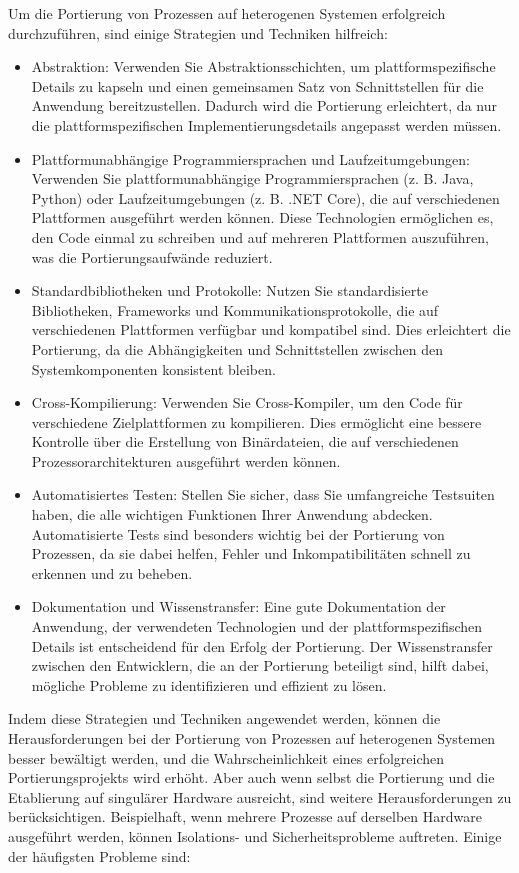 Um die Portierung von Prozessen auf heterogenen Systemen erfolgreich durchzuführen, sind einige Strategien und Techniken hilfreich:
\begin{itemize}
\item Abstraktion: Verwenden Sie Abstraktionsschichten, um plattformspezifische Details zu kapseln und einen gemeinsamen Satz von Schnittstellen für die Anwendung bereitzustellen. Dadurch wird die Portierung erleichtert, da nur die plattformspezifischen Implementierungsdetails angepasst werden müssen.
\item Plattformunabhängige Programmiersprachen und Laufzeitumgebungen: Verwenden Sie plattformunabhängige Programmiersprachen (z. B. Java, Python) oder Laufzeitumgebungen (z. B. .NET Core), die auf verschiedenen Plattformen ausgeführt werden können. Diese Technologien ermöglichen es, den Code einmal zu schreiben und auf mehreren Plattformen auszuführen, was die Portierungsaufwände reduziert.
\item Standardbibliotheken und Protokolle: Nutzen Sie standardisierte Bibliotheken, Frameworks und Kommunikationsprotokolle, die auf verschiedenen Plattformen verfügbar und kompatibel sind. Dies erleichtert die Portierung, da die Abhängigkeiten und Schnittstellen zwischen den Systemkomponenten konsistent bleiben.
\item Cross-Kompilierung: Verwenden Sie Cross-Kompiler, um den Code für verschiedene Zielplattformen zu kompilieren. Dies ermöglicht eine bessere Kontrolle über die Erstellung von Binärdateien, die auf verschiedenen Prozessorarchitekturen ausgeführt werden können.
\item Automatisiertes Testen: Stellen Sie sicher, dass Sie umfangreiche Testsuiten haben, die alle wichtigen Funktionen Ihrer Anwendung abdecken. Automatisierte Tests sind besonders wichtig bei der Portierung von Prozessen, da sie dabei helfen, Fehler und Inkompatibilitäten schnell zu erkennen und zu beheben.
\item Dokumentation und Wissenstransfer: Eine gute Dokumentation der Anwendung, der verwendeten Technologien und der plattformspezifischen Details ist entscheidend für den Erfolg der Portierung. Der Wissenstransfer zwischen den Entwicklern, die an der Portierung beteiligt sind, hilft dabei, mögliche Probleme zu identifizieren und effizient zu lösen.
\end{itemize}
Indem diese Strategien und Techniken angewendet werden, können die Herausforderungen bei der Portierung von Prozessen auf heterogenen Systemen besser bewältigt werden, und die Wahrscheinlichkeit eines erfolgreichen Portierungsprojekts wird erhöht. Aber auch wenn selbst die Portierung und die Etablierung auf singulärer Hardware ausreicht, sind weitere Herausforderungen zu berücksichtigen. Beispielhaft, wenn mehrere Prozesse auf derselben Hardware ausgeführt werden, können Isolations- und Sicherheitsprobleme auftreten. Einige der häufigsten Probleme sind:
